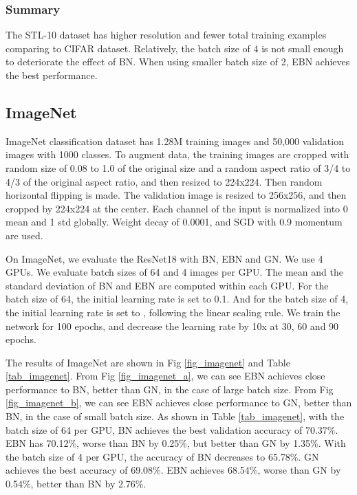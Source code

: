 \documentclass[runningheads]{llncs}
\begin{document}
\subsubsection{Summary}  The STL-10 dataset has higher resolution and fewer total training examples comparing to CIFAR dataset. Relatively, the batch size of 4 is not small enough to deteriorate the effect of BN.
When using smaller batch size of 2, EBN achieves the best performance. 

\subsection{ImageNet}


ImageNet classification dataset \cite{russakovsky2015imagenet} has 1.28M training images and 50,000 validation images with 1000 classes.  To augment data, the training images are cropped with random size of 0.08 to 1.0 of the original size and a random aspect ratio of 3/4 to 4/3 of the original aspect ratio,  and then resized to 224x224. Then random horizontal flipping is made. The validation image is resized to 256x256,  and then cropped by 224x224 at the center. Each channel of the input is normalized into 0 mean and 1 std globally.
Weight decay of 0.0001, and SGD with 0.9 momentum are used. 



On ImageNet, we evaluate the ResNet18 with BN, EBN and GN. We use 4 GPUs. We evaluate batch sizes of 64 and 4 images per GPU.   The mean and the standard deviation of BN and EBN are computed within each GPU. For the batch size of 64, the initial learning rate is set to 0.1. And for the batch size of 4, the initial learning rate is set to , following the linear scaling rule. We train the network for 100 epochs, and decrease the learning rate by 10x at 30, 60 and 90 epochs.



The results of ImageNet are shown in Fig \ref{fig_imagenet}  and Table \ref{tab_imagenet}.  From Fig \ref{fig_imagenet_a}, we can see EBN achieves close performance to BN, better than GN, in the case of large batch size. From Fig \ref{fig_imagenet_b}, we can see EBN achieves close performance to GN, better than BN, in the case of small batch size. As shown in Table \ref{tab_imagenet}, 
with the batch size of 64 per GPU, BN achieves the best validation accuracy of 70.37\%. EBN has 70.12\%, worse than BN by 0.25\%, but better than GN by 1.35\%.  With the batch size of 4 per GPU, the accuracy of BN decreases to 65.78\%.  GN achieves the best accuracy of 69.08\%. EBN achieves 68.54\%, worse than GN by 0.54\%, better than BN by 2.76\%.
\end{document}
